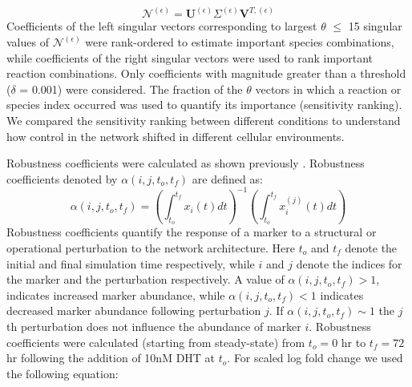 \documentclass[12pt]{article}
\begin{document}
\begin{equation}
	\mathcal{N}^{\left(\epsilon\right)} = \mathbf{U}^{\left(\epsilon\right)}\Sigma^{\left(\epsilon\right)}\mathbf{V}^{T,{\left(\epsilon\right)}}
\end{equation}
Coefficients of the left singular vectors corresponding to largest $\theta$ $\leq$ 15 singular values of $\mathcal{N}^{\left(\epsilon\right)}$ were rank-ordered to estimate important species combinations, while coefficients of the right singular vectors were used to rank important reaction combinations. 
Only coefficients with magnitude greater than a threshold ($\delta$ = 0.001) were considered. 
The fraction of the $\theta$ vectors in which a reaction or species index occurred was used to quantify its importance (sensitivity ranking). 
We compared the sensitivity ranking between different conditions to understand how control in the network shifted in different cellular environments.  

Robustness coefficients were calculated as shown previously \cite{Tasseff2011}. 
Robustness coefficients denoted by $\alpha\left(i,j,t_{o},t_{f}\right)$ are defined as:
\begin{equation}
\alpha\left(i,j,t_{o},t_{f}\right)=\left(\displaystyle\int_{t_{o}}^{t_{f}}x_{i}\left(t\right)dt\right)^{-1}\left(\displaystyle\int_{t_{o}}^{t_{f}}x^{(j)}_{i}\left(t\right)dt\right)
\end{equation}
Robustness coefficients quantify the response of a marker to a structural or operational perturbation to the network architecture.
Here $t_o$ and $t_f$ denote the initial and final simulation time respectively, while $i$ and $j$ denote the indices for the marker and the perturbation respectively. 
A value of $\alpha\left(i,j,t_{o},t_{f}\right)>1$, indicates increased marker abundance, while $\alpha\left(i,j,t_{o},t_{f}\right)<1$ indicates decreased marker abundance following perturbation $j$. 
If $\alpha\left(i,j,t_{o},t_{f}\right)\sim{1}$ the $j$th perturbation does not influence the abundance of marker $i$.
Robustness coefficients were calculated (starting from steady-state) from $t_{o} = 0$ hr to $t_{f} = 72$ hr following the addition of 10nM DHT at $t_{o}$.
For scaled log fold change we used the following equation:
\end{document}

